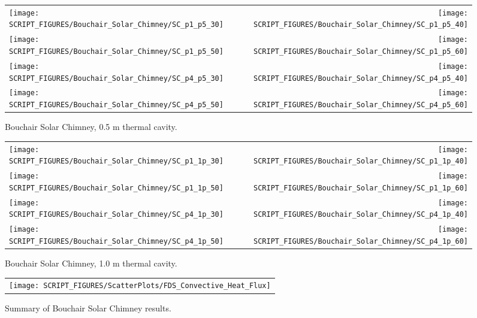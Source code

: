 \begin{figure}[p]
\begin{tabular*}{\textwidth}{l@{\extracolsep{\fill}}r}
\texttt{[image: SCRIPT\_FIGURES/Bouchair\_Solar\_Chimney/SC\_p1\_p5\_30]} &
\texttt{[image: SCRIPT\_FIGURES/Bouchair\_Solar\_Chimney/SC\_p1\_p5\_40]} \\
\texttt{[image: SCRIPT\_FIGURES/Bouchair\_Solar\_Chimney/SC\_p1\_p5\_50]} &
\texttt{[image: SCRIPT\_FIGURES/Bouchair\_Solar\_Chimney/SC\_p1\_p5\_60]} \\
\texttt{[image: SCRIPT\_FIGURES/Bouchair\_Solar\_Chimney/SC\_p4\_p5\_30]} &
\texttt{[image: SCRIPT\_FIGURES/Bouchair\_Solar\_Chimney/SC\_p4\_p5\_40]} \\
\texttt{[image: SCRIPT\_FIGURES/Bouchair\_Solar\_Chimney/SC\_p4\_p5\_50]} &
\texttt{[image: SCRIPT\_FIGURES/Bouchair\_Solar\_Chimney/SC\_p4\_p5\_60]}
\end{tabular*}
\caption[Bouchair Solar Chimney, 0.5 m thermal cavity]{Bouchair Solar Chimney, 0.5 m thermal cavity.}
\label{Bouchair_p5}
\end{figure}

\begin{figure}[p]
\begin{tabular*}{\textwidth}{l@{\extracolsep{\fill}}r}
\texttt{[image: SCRIPT\_FIGURES/Bouchair\_Solar\_Chimney/SC\_p1\_1p\_30]} &
\texttt{[image: SCRIPT\_FIGURES/Bouchair\_Solar\_Chimney/SC\_p1\_1p\_40]} \\
\texttt{[image: SCRIPT\_FIGURES/Bouchair\_Solar\_Chimney/SC\_p1\_1p\_50]} &
\texttt{[image: SCRIPT\_FIGURES/Bouchair\_Solar\_Chimney/SC\_p1\_1p\_60]} \\
\texttt{[image: SCRIPT\_FIGURES/Bouchair\_Solar\_Chimney/SC\_p4\_1p\_30]} &
\texttt{[image: SCRIPT\_FIGURES/Bouchair\_Solar\_Chimney/SC\_p4\_1p\_40]} \\
\texttt{[image: SCRIPT\_FIGURES/Bouchair\_Solar\_Chimney/SC\_p4\_1p\_50]} &
\texttt{[image: SCRIPT\_FIGURES/Bouchair\_Solar\_Chimney/SC\_p4\_1p\_60]}
\end{tabular*}
\caption[Bouchair Solar Chimney, 1.0 m thermal cavity]{Bouchair Solar Chimney, 1.0 m thermal cavity.}
\label{Bouchair_1p}
\end{figure}

\begin{figure}[h!]
\begin{center}
\begin{tabular}{c}
\texttt{[image: SCRIPT\_FIGURES/ScatterPlots/FDS\_Convective\_Heat\_Flux]}
\end{tabular}
\end{center}
\caption[Summary of Bouchair Solar Chimney results]{Summary of Bouchair Solar Chimney results.}
\label{Mass Flow Rate}
\end{figure}


